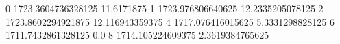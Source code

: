 0 1723.3604736328125 11.6171875
1 1723.976806640625 12.2335205078125
2 1723.8602294921875 12.116943359375
4 1717.076416015625 5.3331298828125
6 1711.7432861328125 0.0
8 1714.105224609375 2.3619384765625

